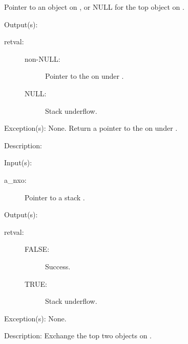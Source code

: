 \begin{capi}
\begin{capilist}
\begin{description}
			Pointer to an object on , or NULL for the
			top object on .
		\end{description}
	\item[Output(s): ]
		\begin{description}\item[]
		\item[retval: ]
			\begin{description}\item[]
			\item[non-NULL: ]
				Pointer to the  on  under
				.
			\item[NULL: ]
				Stack underflow.
			\end{description}
		\end{description}
	\item[Exception(s): ] None.
		Return a pointer to the  on  under
		.
	\item[Description: ]
	\end{capilist}
\label{nxo_stack_exch}
	\begin{capilist}
	\item[Input(s): ]
		\begin{description}\item[]
		\item[a\_nxo: ]
			Pointer to a stack .
		\end{description}
	\item[Output(s): ]
		\begin{description}\item[]
		\item[retval: ]
			\begin{description}\item[]
			\item[FALSE: ]
				Success.
			\item[TRUE: ]
				Stack underflow.
			\end{description}
		\end{description}
	\item[Exception(s): ] None.
	\item[Description: ]
		Exchange the top two objects on .
	\end{capilist}
\label{nxo_stack_rool}

\end{capi}
